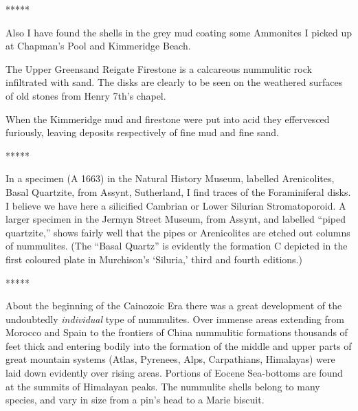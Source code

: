 \documentclass[a4paper, 12pt, oneside]{article}
\begin{document}
\centerline{*\hspace{15mm}*\hspace{15mm}*\hspace{15mm}*\hspace{15mm}*}
\bigskip

Also I have found the shells in the grey mud coating some Ammonites I picked up at Chapman's Pool and Kimmeridge Beach.

The Upper Greensand Reigate Firestone is a calcareous nummulitic rock infiltrated with sand. The disks are clearly to be seen on the weathered surfaces of old stones from Henry 7th's chapel.

When the Kimmeridge mud and firestone were put into acid they effervesced furiously, leaving deposits respectively of fine mud and fine sand.

\centerline{*\hspace{15mm}*\hspace{15mm}*\hspace{15mm}*\hspace{15mm}*}
\bigskip

In a specimen (A 1663) in the Natural History Museum, labelled Arenicolites, Basal Quartzite, from Assynt, Sutherland, I find traces of the Foraminiferal disks. I believe we have here a silicified Cambrian or Lower Silurian Stromatoporoid. A larger specimen in the Jermyn Street Museum, from Assynt, and labelled ``piped quartzite,'' shows fairly well that the pipes or Arenicolites are etched out columns of nummulites. (The ``Basal Quartz'' is evidently the formation C depicted in the first coloured plate in Murchison's `Siluria,' third and fourth editions.)

\centerline{*\hspace{15mm}*\hspace{15mm}*\hspace{15mm}*\hspace{15mm}*}
\bigskip

About the beginning of the Cainozoic Era there was a great development of the undoubtedly \emph{individual} type of nummulites. Over immense areas extending from Morocco and Spain to the frontiers of China nummulitic formations thousands of feet thick and entering bodily into the formation of the middle and upper parts of great mountain systems (Atlas, Pyrenees, Alps, Carpathians, Himalayas) were laid down evidently over rising areas. Portions of Eocene Sea-bottoms are found at the summits of Himalayan peaks. The nummulite shells belong to many species, and vary in size from a pin's head to a Marie biscuit.
\end{document}
